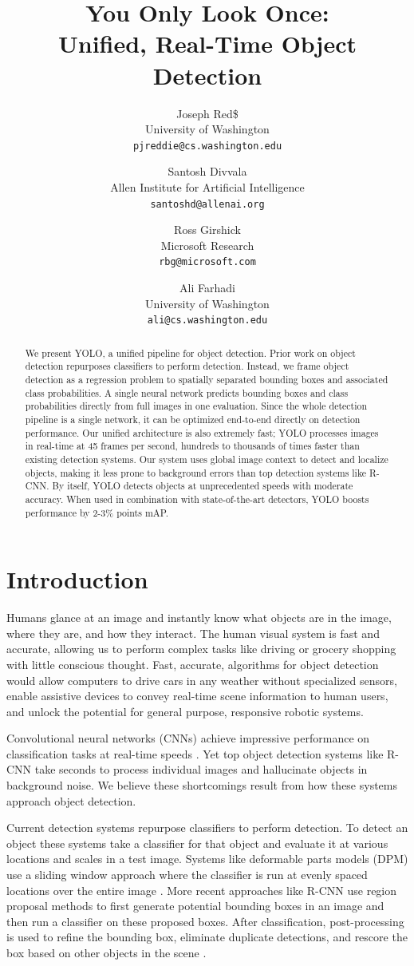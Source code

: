 \documentclass{article} %
\title{You Only Look Once: \\
Unified, Real-Time Object Detection}
\author{Joseph Red\$\\
University of Washington\\
\texttt{pjreddie@cs.washington.edu}
\and
Santosh Divvala\\
Allen Institute for Artificial Intelligence\\
\texttt{santoshd@allenai.org}
\and
Ross Girshick\\
Microsoft Research\\
\texttt{rbg@microsoft.com}
\and
Ali Farhadi\\
University of Washington\\
\texttt{ali@cs.washington.edu}
}
\begin{document}
\maketitle

\begin{abstract}
We present YOLO, a unified pipeline for object detection. Prior work on object detection repurposes classifiers to perform detection. Instead, we frame object detection as a regression problem to spatially separated bounding boxes and associated class probabilities. A single neural network predicts bounding boxes and class probabilities directly from full images in one evaluation. Since the whole detection pipeline is a single network, it can be optimized end-to-end directly on detection performance. Our unified architecture is also extremely fast; YOLO processes images in real-time at 45 frames per second, hundreds to thousands of times faster than existing detection systems. Our system uses global image context to detect and localize objects, making it less prone to background errors than top detection systems like R-CNN. By itself, YOLO detects objects at unprecedented speeds with moderate accuracy. When used in combination with state-of-the-art detectors, YOLO boosts performance by 2-3\% points mAP.
\end{abstract}

\section{Introduction}

Humans glance at an image and instantly know what objects are in the image, where they are, and how they interact. The human visual system is fast and accurate, allowing us to perform complex tasks like driving or grocery shopping with little conscious thought. Fast, accurate, algorithms for object detection would allow computers to drive cars in any weather without specialized sensors, enable assistive devices to convey real-time scene information to human users, and unlock the potential for general purpose, responsive robotic systems.

Convolutional neural networks (CNNs) achieve impressive performance on classification tasks at real-time speeds \cite{DBLP:journals/corr/HeZR015}. Yet top object detection systems like R-CNN take seconds to process individual images and hallucinate objects in background noise. We believe these shortcomings result from how these systems approach object detection.

Current detection systems repurpose classifiers to perform detection. To detect an object these systems take a classifier for that object and evaluate it at various locations and scales in a test image. Systems like deformable parts models (DPM) use a sliding window approach where the classifier is run at evenly spaced locations over the entire image \cite{lsvm-pami}. More recent approaches like R-CNN use region proposal methods to first generate potential bounding boxes in an image and then run a classifier on these proposed boxes. After classification, post-processing is used to refine the bounding box, eliminate duplicate detections, and rescore the box based on other objects in the scene \cite{girshick2014rich}.
\end{document}
